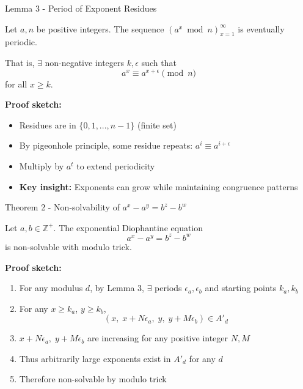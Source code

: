 \begin{frame}{Lemma 3 - Period of Exponent Residues}
    \begin{lemmas}
        Let $a,n$ be positive integers. The sequence $(a^x \bmod n)_{x=1}^\infty$ is eventually periodic.

        That is, $\exists$ non-negative integers $k,\epsilon$ such that
        \[a^x \equiv a^{x+\epsilon} \pmod n\]
        for all $x \geq k$.
    \end{lemmas}

    \textbf{Proof sketch:}
    \begin{itemize}
        \item Residues are in $\{0,1,...,n-1\}$ (finite set)
        \item By pigeonhole principle, some residue repeats: $a^i \equiv a^{i+\epsilon}$
        \item Multiply by $a^t$ to extend periodicity
        \item \textbf{Key insight:} Exponents can grow while maintaining congruence patterns
    \end{itemize}
\end{frame}

\begin{frame}{Theorem 2 - Non-solvability of $a^x-a^y = b^z-b^w$}
    \begin{theorems}
        Let $a,b \in \mathbb{Z}^+$. The exponential Diophantine equation
        \[a^x - a^y = b^z - b^w\]
        is non-solvable with modulo trick.
    \end{theorems}

    \textbf{Proof sketch:}
    \begin{enumerate}
        \item For any modulus $d$, by Lemma 3, $\exists$ periods $\epsilon_a,\epsilon_b$ and starting points $k_a,k_b$
        \item For any $x \geq k_a$, $y \geq k_b$,
            \[(x,\; x+N\epsilon_a,\; y,\; y+M\epsilon_b) \in A'_d\]
        \item$x+N\epsilon_a,\;y+M\epsilon_b $ are increasing for any positive integer $N,M$
        \item Thus arbitrarily large exponents exist in $A'_d$ for any $d$
        \item Therefore non-solvable by modulo trick
    \end{enumerate}
\end{frame}

